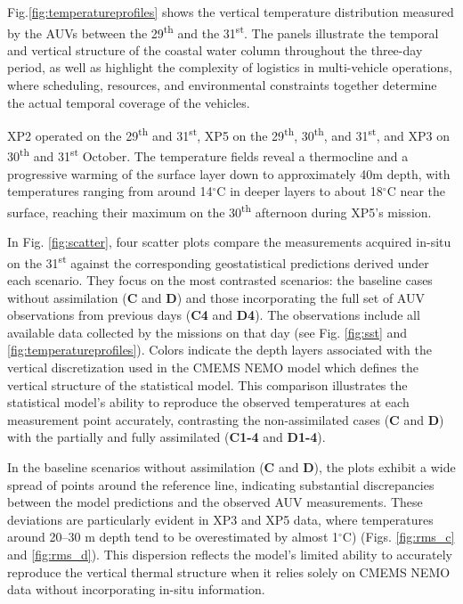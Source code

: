 Fig.\ref{fig:temperatureprofiles} shows the vertical temperature
distribution measured by the AUVs between the 29\textsuperscript{th}
and the 31\textsuperscript{st}. The panels illustrate the temporal and
vertical structure of the coastal water column throughout the
three-day period, as well as highlight the complexity of
logistics in multi-vehicle operations, where scheduling, resources,
and environmental constraints together determine the actual temporal
coverage of the vehicles.

XP2 operated on the 29\textsuperscript{th} and
31\textsuperscript{st}, XP5 on the 29\textsuperscript{th},
30\textsuperscript{th}, and 31\textsuperscript{st}, and XP3 on
30\textsuperscript{th} and 31\textsuperscript{st} October.  The
temperature fields reveal a thermocline and a progressive warming of
the surface layer down to approximately 40m depth, with temperatures
ranging from around 14$^{\circ}$C in deeper layers to about
18$^{\circ}$C near the surface, reaching their maximum on the
30\textsuperscript{th} afternoon during XP5’s mission.


In Fig. \ref{fig:scatter}, four scatter plots compare the measurements
acquired in-situ on the 31\textsuperscript{st} against the
corresponding geostatistical predictions derived under each
scenario. They focus on the most contrasted scenarios: the baseline
cases without assimilation (\textbf{C} and \textbf{D}) and those
incorporating the full set of AUV observations from previous days
(\textbf{C4} and \textbf{D4}). The observations include all available
data collected by the missions on that day (see Fig. \ref{fig:sst} and
\ref{fig:temperatureprofiles}). Colors indicate the depth layers
associated with the vertical discretization used in the CMEMS
  NEMO model which defines the vertical structure of the statistical
model.  This comparison illustrates the statistical model's ability to
reproduce the observed temperatures at each measurement point
accurately, contrasting the non-assimilated cases (\textbf{C} and
\textbf{D}) with the partially and fully assimilated (\textbf{C1-4}
and \textbf{D1-4}).

In the baseline scenarios without assimilation (\textbf{C} and
\textbf{D}), the plots exhibit a wide spread of points around the
reference line, indicating substantial discrepancies between the model
predictions and the observed AUV measurements. These deviations are
particularly evident in XP3 and XP5 data, where temperatures around
20--30 m depth tend to be overestimated by almost 1$^{\circ}$C)
(Figs. \ref{fig:rms_c} and \ref{fig:rms_d}). This dispersion reflects
the model’s limited ability to accurately reproduce the vertical
thermal structure when it relies solely on CMEMS NEMO data
without incorporating in-situ information.

